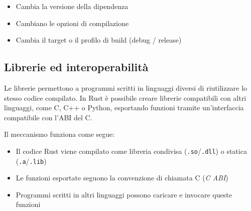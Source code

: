 \begin{itemize}
  \item Cambia la versione della dipendenza
  \item Cambiano le opzioni di compilazione
  \item Cambia il target o il profilo di build (debug / release)
\end{itemize}










\subsection{Librerie ed interoperabilità}
Le librerie permettono a programmi scritti in linguaggi diversi di riutilizzare
lo stesso codice compilato. In Rust è possibile creare librerie compatibili con
altri linguaggi, come C, C++ o Python, esportando funzioni tramite
un'interfaccia compatibile con l'ABI del C.

Il meccanismo funziona come segue:
\begin{itemize}
  \item Il codice Rust viene compilato come libreria condivisa (\texttt{.so}/\texttt{.dll})
        o statica (\texttt{.a}/\texttt{.lib})
  \item Le funzioni esportate seguono la convenzione di chiamata C (\textit{C ABI})
  \item Programmi scritti in altri linguaggi possono caricare e invocare queste funzioni
\end{itemize}


